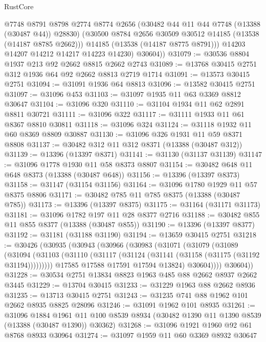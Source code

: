 \begin{lexlean}{RustCore}
\begin{coremodule}
            @7748
            @8791
            @8798
            @2774
            @8774
            @2656
            (@30482 @44 @11 @44 @7748 (@13388 (@30487 @44)) @28830)
            (@30500 @8784 @2656 @30509 @30512 @14185 (@13538 (@14187 @8785 @2662)))
            @14185
            (@13538 (@14187 @8775 @8791)))
          @14203
          @14207
          @14212
          @14217
          @14223
          @14230)
        @30604))
@31079 := @30536 @8804 @1937 @213 @92 @2662 @8815 @2662 @2743
@31089 := @13768 @30415 @2751 @312 @1936 @64 @92 @2662 @8813 @2719 @1714
@31091 := @13573 @30415 @2751
@31094 := @31091 @1936 @64 @8813
@31096 := @13582 @30415 @2751
@31097 := @31096 @453
@31103 := @31097 @1935 @11 @63 @3369 @8812 @30647
@31104 := @31096 @320
@31110 := @31104 @1934 @11 @62 @2891 @8811 @30721
@31111 := @31096 @322
@31117 := @31111 @1933 @11 @61 @8367 @8810 @30811
@31118 := @31096 @324
@31124 := @31118 @1932 @11 @60 @8369 @8809 @30887
@31130 := @31096 @326 @1931 @11 @59 @8371 @8808
@31137 := @30482 @312 @11 @312 @8371 (@13388 (@30487 @312))
@31139 := @13396 (@13397 @8371)
@31141 := @31130 (@31137 @31139)
@31147 := @31096 @1778 @1930 @11 @58 @8373 @8807
@31154 := @30482 @648 @11 @648 @8373 (@13388 (@30487 @648))
@31156 := @13396 (@13397 @8373)
@31158 := @31147 (@31154 @31156)
@31164 := @31096 @1780 @1929 @11 @57 @8375 @8806
@31171 := @30482 @785 @11 @785 @8375 (@13388 (@30487 @785))
@31173 := @13396 (@13397 @8375)
@31175 := @31164 (@31171 @31173)
@31181 := @31096 @1782 @197 @11 @28 @8377 @2716
@31188 := @30482 @855 @11 @855 @8377 (@13388 (@30487 @855))
@31190 := @13396 (@13397 @8377)
@31192 := @31181 (@31188 @31190)
@31194 := @13659 @30415 @2751
@31218 := @30426
    (@30935
      (@30943
        (@30966
          (@30983
            (@31071
              (@31079
                (@31089
                  (@31094
                    (@31103 (@31110 (@31117 (@31124 (@31141 (@31158 (@31175 (@31192 @31194)))))))))
                  @17585
                  @17588
                  @17591
                  @17594
                  @13824)
                @30604))))
        @30604))
@31228 := @30534 @2751 @13834 @8823 @1963 @485 @88 @2662 @8937 @2662 @3445
@31229 := @13704 @30415
@31233 := @31229 @1963 @88 @2662 @8936
@31235 := @13713 @30415 @2751
@31243 := @31235 @741 @88 @1962 @101 @2662 @8935 @8825 @28096
@31246 := @31091 @1962 @101 @8935
@31261 := @31096
    @1884
    @1961
    @11
    @100
    @8539
    @8934
    (@30482 @1390 @11 @1390 @8539 (@13388 (@30487 @1390)) @30362)
@31268 := @31096 @1921 @1960 @92 @61 @8768 @8933 @30964
@31274 := @31097 @1959 @11 @60 @3369 @8932 @30647

\end{coremodule}
\end{lexlean}
